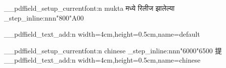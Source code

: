 \documentclass{article}
\begin{document}
\ExplSyntaxOn
{
  \__pdffield_setup_currentfont:n {mukta}
मध्ये रिलीज झालेल्या
\int_step_inline:nnn{"800}{"A00}
         {
         }
 
\__pdffield_text_add:n {width=4cm,height=0.5cm,name=default}
}

\par \__pdffield_setup_currentfont:n {chinese}
\int_step_inline:nnn{"6000}{"6500}
         {
         }
提 
\__pdffield_text_add:n {width=4cm,height=0.5cm,name=chinese}

\ExplSyntaxOff
\end{document}
